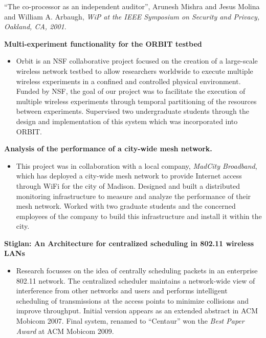 \begin{resume}
\mybullet ``The co-processor as an independent auditor'', Arunesh Mishra and Jesus Molina and William A. Arbaugh,
{\em WiP at the IEEE Symposium on Security and Privacy, Oakland, CA, 2001}.


{\bf Multi-experiment functionality for the ORBIT testbed}
    \begin{itemize}
	\item [] Orbit is an NSF collaborative project focused on the creation of a large-scale wireless network testbed
to allow researchers worldwide to execute  multiple wireless experiments in a
confined and controlled  physical environment.  Funded by NSF, the goal of our
project was to facilitate the execution of multiple wireless experiments
through temporal partitioning of the resources between experiments. Supervised two
undergraduate students through the design and implementation of this system
which was incorporated into ORBIT.
    \end{itemize}
\vspace{-0.2cm}
{\bf Analysis of the performance of a city-wide mesh network. }
    \begin{itemize}
	\item [] This project was in collaboration with a local company, {\it MadCity
 Broadband}, which has deployed a city-wide mesh network to provide Internet access through WiFi
for the city of Madison. Designed and built a distributed monitoring
infrastructure to measure and analyze the performance of their mesh network.
Worked with two graduate students and the concerned employees of the company to
build this infrastructure and install it within the city.
    \end{itemize}
\vspace{-0.2cm}

{\bf Stiglan: An Architecture for centralized scheduling in 802.11 wireless LANs}
    \begin{itemize}
	\item [] Research focusses on the idea of centrally scheduling packets
	in an enterprise 802.11 network. The centralized scheduler maintains a
	network-wide view of interference from other networks and users and
	performs intelligent scheduling of transmissions at the access points
	to minimize collisions and improve throughput. Initial version appears
	as an extended abstract in ACM Mobicom 2007. Final system, renamed to
	``Centaur'' won the {\em Best Paper Award} at ACM Mobicom 2009.
    \end{itemize}
\vspace{-0.2cm}


\end{resume}
